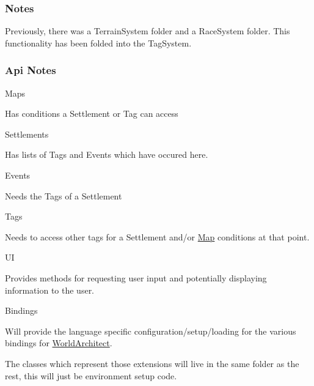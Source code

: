 \subsubsection*{Notes}

Previously, there was a Terrain\+System folder and a Race\+System folder. This functionality has been folded into the Tag\+System.

\subsubsection*{Api Notes}


\begin{DoxyItemize}
\item Maps
\begin{DoxyItemize}
\item Has conditions a Settlement or Tag can access
\end{DoxyItemize}
\item Settlements
\begin{DoxyItemize}
\item Has lists of Tags and Events which have occured here.
\end{DoxyItemize}
\item Events
\begin{DoxyItemize}
\item Needs the Tags of a Settlement
\end{DoxyItemize}
\item Tags
\begin{DoxyItemize}
\item Needs to access other tags for a Settlement and/or \mbox{\hyperlink{class_map}{Map}} conditions at that point.
\end{DoxyItemize}
\item UI
\begin{DoxyItemize}
\item Provides methods for requesting user input and potentially displaying information to the user.
\end{DoxyItemize}
\item Bindings
\begin{DoxyItemize}
\item Will provide the language specific configuration/setup/loading for the various bindings for \mbox{\hyperlink{namespace_world_architect}{World\+Architect}}.
\item The classes which represent those extensions will live in the same folder as the rest, this will just be environment setup code. 
\end{DoxyItemize}
\end{DoxyItemize}